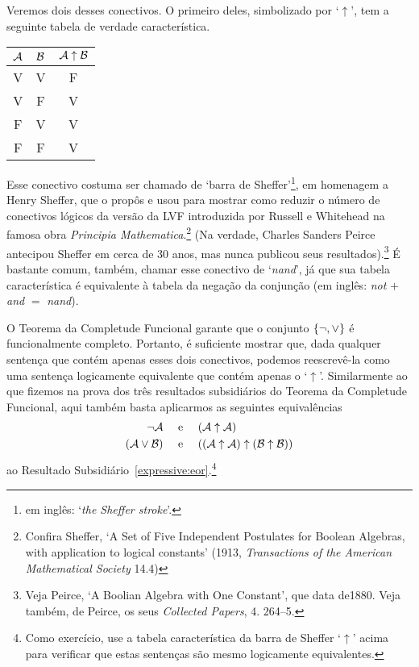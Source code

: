Veremos dois desses conectivos.
O primeiro deles, simbolizado por `$\uparrow$', tem a seguinte tabela de verdade característica. 
\begin{center}
\begin{tabular}{c c | c}
$\mathcal{A}$ & $\mathcal{B}$ & $\mathcal{A} \mathrel{\uparrow} \mathcal{B}$\\
\hline
 V & V & F \\
 V & F & V \\
 F & V & V  \\
 F & F & V
\end{tabular}
\end{center}

Esse conectivo costuma ser chamado de `barra de Sheffer'\footnote{ em inglês: `\emph{the Sheffer stroke}'.}, em homenagem a Henry Sheffer, que o propôs e usou para mostrar como reduzir o número de conectivos lógicos da versão da LVF introduzida por Russell e Whitehead na famosa obra  \emph{Principia Mathematica}.\footnote{
 Confira Sheffer, `A Set of Five Independent Postulates for Boolean Algebras, with application to logical constants' (1913, \emph{Transactions of the American Mathematical Society} 14.4)}
 (Na verdade, Charles Sanders Peirce antecipou Sheffer em cerca de 30 anos, mas nunca publicou seus resultados).\footnote{
 Veja Peirce, `A Boolian Algebra with One Constant', que data de1880. Veja também, de Peirce, os seus  \emph{Collected Papers}, 4. 264--5.}
 É bastante comum, também, chamar esse conectivo de `\emph{nand}', já que sua tabela característica é equivalente à tabela da negação da conjunção (em inglês: \emph{not} $+$ \emph{and} $=$ \emph{nand}).

O Teorema da Completude Funcional garante que o conjunto $\{\neg, \vee\}$ é funcionalmente completo.
Portanto, é suficiente mostrar que, dada qualquer sentença que contém apenas esses dois conectivos, podemos reescrevê-la como uma sentença logicamente equivalente que contém apenas o `$\uparrow$'.
Similarmente ao que fizemos na prova dos três resultados subsidiários do Teorema da Completude Funcional, aqui também basta aplicarmos as seguintes equivalências
		\begin{align*}
			\neg \mathcal{A} &\text{\quad \ e \quad} (\mathcal{A} \uparrow \mathcal{A})\\
			(\mathcal{A} \vee \mathcal{B}) & \text{\quad \ e \quad} ((\mathcal{A} \uparrow \mathcal{A}) \uparrow (\mathcal{B} \uparrow \mathcal{B}))
		\end{align*}
ao Resultado Subsidiário~\ref{expressive:eor}.\footnote{
	Como exercício, use a tabela característica da barra de Sheffer `$\uparrow$' acima para verificar que estas sentenças são mesmo logicamente equivalentes.}

